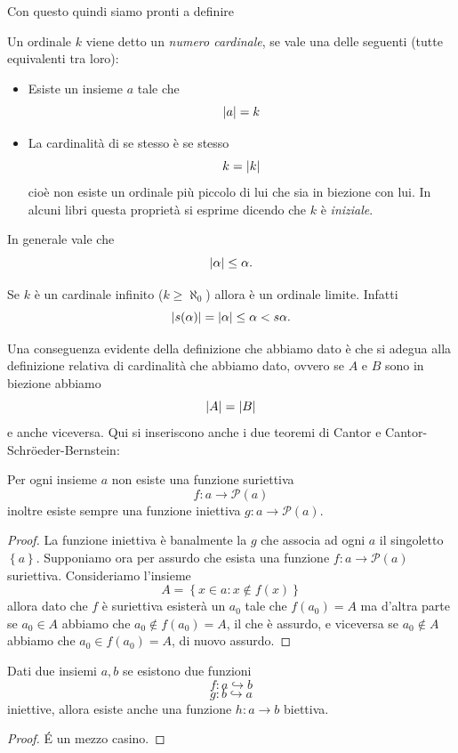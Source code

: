 \documentclass[11pt]{scrartcl}
\newcommand{\parti}[1]{\mathcal{P}\!\left(#1\right)}
\begin{document}
 	Con questo quindi siamo pronti a definire
 	\begin{definition}
 		Un ordinale $k$ viene detto un \textit{numero cardinale}, se vale una delle seguenti (tutte equivalenti tra loro):
 		\begin{itemize}
 			\item Esiste un insieme $a$ tale che
 			$$\left\lvert a \right\rvert=k$$
 			\item La cardinalità di se stesso è se stesso
 			$$k=\left\lvert k \right\rvert$$
 			cioè non esiste un ordinale più piccolo di lui che sia in biezione con lui. In alcuni libri questa proprietà si esprime dicendo che $k$ è \textit{iniziale}.
 		\end{itemize}
 	\end{definition}
 	\begin{remark}
 		In generale vale che
 		$$\left\lvert \alpha \right\rvert\le \alpha.$$
 	\end{remark}
 	\begin{remark}
 		Se $k$ è un cardinale infinito ($k\ge \aleph_0$) allora è un ordinale limite. Infatti
 		$$\left\lvert s(\alpha) \right\rvert=\left\lvert \alpha \right\rvert\le \alpha < s\alpha.$$
 	\end{remark}
 	Una conseguenza evidente della definizione che abbiamo dato è che si adegua alla definizione relativa di cardinalità che abbiamo dato, ovvero se $A$ e $B$ sono in biezione abbiamo
 	$$\left\lvert A \right\rvert=\left\lvert B \right\rvert$$
 	e anche viceversa. Qui si inseriscono anche i due teoremi di Cantor e Cantor-Schr\"oeder-Bernstein:
 	\begin{theorem}[Cantor]
 		Per ogni insieme $a$ non esiste una funzione suriettiva 
 		$$f:a\to \parti{a}$$
 		inoltre esiste sempre una funzione iniettiva $g:a\to\parti{a}$.
 	\end{theorem}
 	\begin{proof}
 		La funzione iniettiva è banalmente la $g$ che associa ad ogni $a$ il singoletto $\left\{a\right\}$.
 		Supponiamo ora per assurdo che esista una funzione $f:a\to \parti{a}$ suriettiva. Consideriamo l'insieme 
 		$$A=\left\{x\in a:x\not\in f(x)\right\}$$
 		allora dato che $f$ è suriettiva esisterà un $a_0$ tale che $f(a_0)=A$ ma d'altra parte se $a_0\in A$ abbiamo che $a_0\not\in f(a_0)=A$, il che è assurdo, e viceversa se $a_0\not\in A$ abbiamo che $a_0\in f(a_0)=A$, di nuovo assurdo. 
 	\end{proof} 
 	\begin{theorem}
 		Dati due insiemi $a,b$ se esistono due funzioni 
 		$$f:a\hookrightarrow b$$
 		$$g:b\hookrightarrow a$$
 		iniettive, allora esiste anche una funzione $h:a\to b$ biettiva.
 	\end{theorem}
 	\begin{proof}
 		\'E un mezzo casino.
 	\end{proof}
\end{document}
